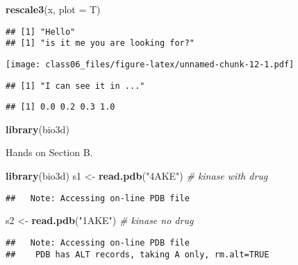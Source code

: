 \documentclass[
]{article}
\newenvironment{Shaded}{\begin{snugshade}}{\end{snugshade}}
\newcommand{\CommentTok}[1]{\textcolor[rgb]{0.56,0.35,0.01}{\textit{#1}}}
\newcommand{\DataTypeTok}[1]{\textcolor[rgb]{0.13,0.29,0.53}{#1}}
\newcommand{\KeywordTok}[1]{\textcolor[rgb]{0.13,0.29,0.53}{\textbf{#1}}}
\newcommand{\NormalTok}[1]{#1}
\newcommand{\StringTok}[1]{\textcolor[rgb]{0.31,0.60,0.02}{#1}}
\begin{document}
\begin{Shaded}
\begin{Highlighting}[]
\KeywordTok{rescale3}\NormalTok{(x, }\DataTypeTok{plot =}\NormalTok{ T)}
\end{Highlighting}
\end{Shaded}

\begin{verbatim}
## [1] "Hello"
## [1] "is it me you are looking for?"
\end{verbatim}

\texttt{[image: class06\_files/figure-latex/unnamed-chunk-12-1.pdf]}

\begin{verbatim}
## [1] "I can see it in ..."
\end{verbatim}

\begin{verbatim}
## [1] 0.0 0.2 0.3 1.0
\end{verbatim}

\begin{Shaded}
\begin{Highlighting}[]
\KeywordTok{library}\NormalTok{(bio3d)}
\end{Highlighting}
\end{Shaded}

Hands on Section B.

\begin{Shaded}
\begin{Highlighting}[]
\KeywordTok{library}\NormalTok{(bio3d)}
\NormalTok{s1 <-}\StringTok{ }\KeywordTok{read.pdb}\NormalTok{(}\StringTok{"4AKE"}\NormalTok{) }\CommentTok{# kinase with drug}
\end{Highlighting}
\end{Shaded}

\begin{verbatim}
##   Note: Accessing on-line PDB file
\end{verbatim}

\begin{Shaded}
\begin{Highlighting}[]
\NormalTok{s2 <-}\StringTok{ }\KeywordTok{read.pdb}\NormalTok{(}\StringTok{"1AKE"}\NormalTok{) }\CommentTok{# kinase no drug}
\end{Highlighting}
\end{Shaded}

\begin{verbatim}
##   Note: Accessing on-line PDB file
##    PDB has ALT records, taking A only, rm.alt=TRUE
\end{verbatim}
\end{document}
